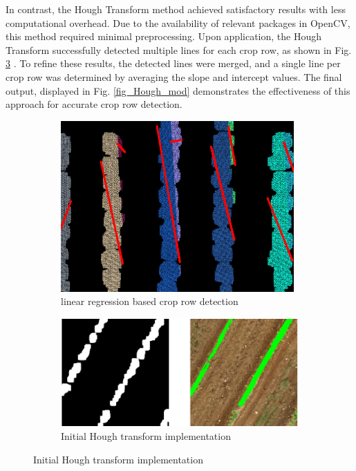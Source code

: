\documentclass[conference]{IEEEtran}
\begin{document}
	In contrast, the Hough Transform method achieved satisfactory results with less computational overhead. Due to the availability of relevant packages in OpenCV, this method required minimal preprocessing. Upon application, the Hough Transform successfully detected multiple lines for each crop row, as shown in Fig. 
	\ref{fig_Hough_Init}
	. To refine these results, the detected lines were merged, and a single line per crop row was determined by averaging the slope and intercept values. The final output, displayed in Fig. 
	\ref{fig_Hough_mod} demonstrates the effectiveness of this approach for accurate crop row detection.
	
	\begin{figure}[t]
		\centering
		\begin{subfigure}{\linewidth}
			\centering
			\includegraphics[width=0.5\linewidth]{Kmeans_Row_Result.png}
			\caption{linear regression based crop row detection}
			\label{fig_Linear_Regression}
		\end{subfigure}
		
		\vspace{0.5cm}
		
		\begin{subfigure}{\linewidth}
			\centering
			\includegraphics[width=0.7\linewidth]{Hough initial2.png}
			\caption{Initial Hough transform implementation}
			\label{fig_Hough_Init}
		\end{subfigure}
		
		\vspace{0.5cm} %
		

\end{figure}
\end{document}
